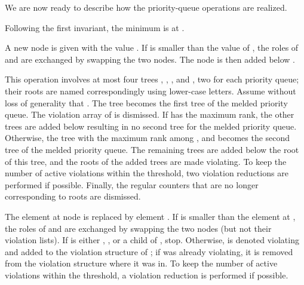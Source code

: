\documentclass{llncs}
\newcommand{\Findmin}{\mbox{\mbox{\rm -}}}
\newcommand{\Insert}{\mbox{}}
\newcommand{\Decrease}{\mbox{}}
\newcommand{\Meld}{\mbox{}}
\begin{document}
We are now ready to describe how the priority-queue operations are realized.
\begin{description}
\vspace{-.05in}
\item[\Findmin{}:] Following the first invariant, the minimum is at .

\item[\Insert{}:] A new node  is given with the value
  . If  is smaller than the value of , the
  roles of  and  are exchanged by swapping the two nodes. The
  node  is then added below .

\item[\Meld{}:] This operation involves at most four trees , , , and ,
  two for each priority queue; their roots are named correspondingly using lower-case letters. 
  Assume without loss of generality that .
  The tree  becomes the first tree of the melded priority queue.  
  The violation array of  is dismissed.  
  If  has the maximum rank, the other trees are added below  
  resulting in no second tree for the melded priority queue.  
  Otherwise, the tree with the maximum rank among , and 
  becomes the second tree of the melded priority queue. The remaining trees are
  added below the root of this tree, and
  the roots of the added trees are made violating. To keep the number
  of active violations within the threshold, two violation
  reductions are performed if possible. Finally, the regular counters
  that are no longer corresponding to roots are dismissed.

\item[\Decrease{}:] The element at node  is replaced by
  element . If  is smaller than the element at , the roles
  of  and  are exchanged by swapping the two nodes (but not
  their violation lists).  If  is either , , or a
  child of , stop.  Otherwise,  is denoted violating and added
  to the violation structure of ; if  was already violating,
  it is removed from the violation structure where it was in.  To keep
  the number of active violations within the threshold, a violation
  reduction is performed if possible.


\end{description}
\end{document}
